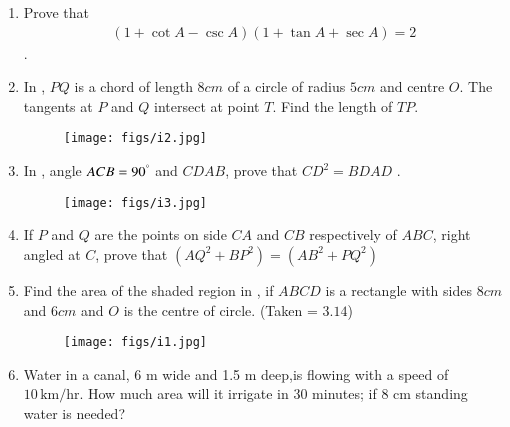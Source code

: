 \documentclass[12pt,-letter paper]{article}
\begin{document}
\begin{enumerate}
	\item Prove that \begin{align*}(1+\cot A - \csc A) (1 + \tan A +\sec A) = 2 \end{align*}.
\item In , $PQ$ is a chord of length $8 cm$ of a circle of radius $5 cm$ and centre $O$. The tangents at $P$ and $Q$ intersect at point $T$. Find the length of $TP$.
\begin{figure}[H]                                             \centering
         \texttt{[image: figs/i2.jpg]}
			\caption{}
			\label{fig:figure2}

                \end{figure}
	\item In , angle $ACB = 90^\degree$  and $CDAB$, prove that $CD ^ 2 = BDAD$ .
\begin{figure}[H]                                                            \centering
                        \texttt{[image: figs/i3.jpg]}
			\caption{}
			\label{fig:figure3}
                \end{figure}
\item If $P$ and $Q$ are the points on side $CA$ and $CB$ respectively of  $ABC$, right angled at $C$, prove that $(AQ^2 + BP^2) = (AB^2 +PQ^2)$
\item Find the area of the shaded region in , if $ABCD$ is a rectangle with sides $8 cm$ and $6 cm$ and $O$ is the centre of circle. (Taken = $3.14$)
	\begin{figure}[H]                                     \centering
	\texttt{[image: figs/i1.jpg]}
		\caption{}
		\label{fig:figure4}

                \end{figure}

	\item Water in a canal, 6 m wide and 1.5 m deep,is flowing with a speed of $10 \,\text{km/hr}$. How much area will it irrigate in 30 minutes; if 8 cm standing water is needed?



\end{enumerate}
\end{document}
